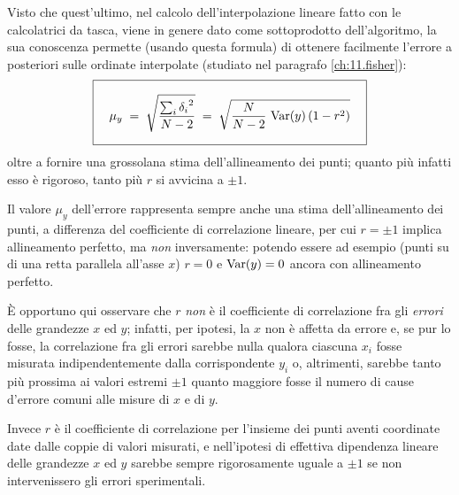 Visto che quest'ultimo, nel calcolo dell'interpolazione
lineare fatto con le calcolatrici da tasca, viene in genere
dato come sottoprodotto dell'algoritmo, la sua conoscenza
permette (usando questa formula) di ottenere facilmente
l'errore a posteriori sulle ordinate interpolate (studiato
nel paragrafo \ref{ch:11.fisher}):
\begin{equation}%
  \label{eq:c.fishalt}%
  \index{errore!a posteriori}
  \boxed{ \rule[-6mm]{0mm}{16mm} \quad
    \mu_y \; = \; \sqrt{
    \dfrac{\sum_i {\delta_i}^2}{N-2} } \; = \;
    \sqrt{ \dfrac{N}{N-2} \, \var(y)
    \left( 1 - r^2 \right)}
  \quad }
\end{equation}
oltre a fornire una grossolana stima dell'allineamento dei
punti; quanto pi\`u infatti esso \`e rigoroso, tanto pi\`u
$r$ si avvicina a $\pm 1$.

Il valore $\mu_y$ dell'errore rappresenta sempre anche una
stima dell'allineamento dei punti, a differenza del
coefficiente di correlazione lineare, per cui $r = \pm 1$
implica allineamento perfetto, ma \emph{non} inversamente:
potendo essere ad esempio (punti su di una retta parallela
all'asse $x$) $r = 0$ e $\operatorname{Var}(y) = 0$ ancora con
allineamento perfetto.

\`E opportuno qui osservare che $r$ \emph{non} \`e il
coefficiente di correlazione fra gli \emph{errori} delle
grandezze $x$ ed $y $; infatti, per ipotesi, la $x$ non \`e
affetta da errore e, se pur lo fosse, la correlazione fra
gli errori sarebbe nulla qualora ciascuna $x_i$ fosse
misurata indipendentemente dalla corrispondente $y_i$ o,
altrimenti, sarebbe tanto pi\`u prossima ai valori estremi
$\pm 1$ quanto maggiore fosse il numero di cause d'errore
comuni alle misure di $x$ e di $y$.

Invece $r$ \`e il coefficiente di correlazione per l'insieme
dei punti aventi coordinate date dalle coppie di valori
misurati, e nell'ipotesi di effettiva dipendenza lineare
delle grandezze $x$ ed $y$ sarebbe sempre rigorosamente
uguale a $\pm 1$ se non intervenissero gli errori
sperimentali.%

